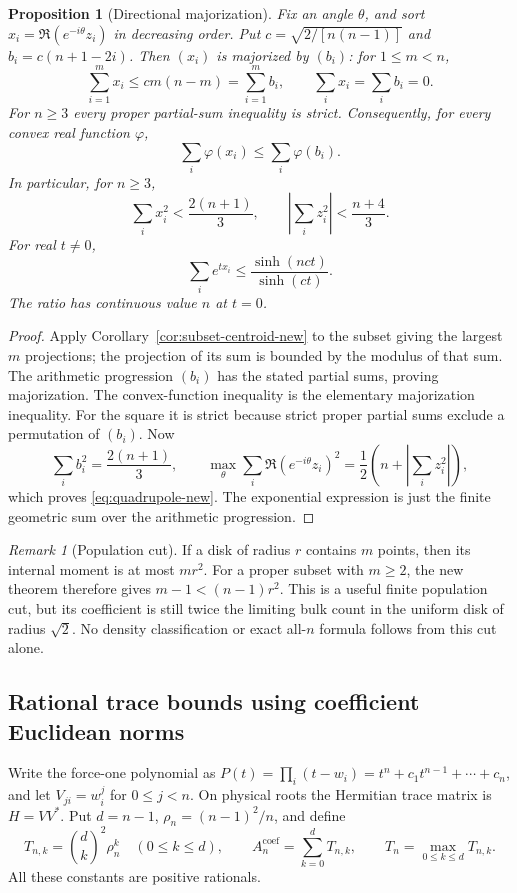 \documentclass[11pt]{article}
\newtheorem{proposition}[theorem]{Proposition}
\theoremstyle{remark}
\newtheorem{remark}[theorem]{Remark}
\numberwithin{equation}{section}
\begin{document}
\begin{proposition}[Directional majorization]\label{prop:projection-new}
Fix an angle $\theta$, and sort
$x_i=\Re(e^{-i\theta}z_i)$ in decreasing order. Put
$c=\sqrt{2/[n(n-1)]}$ and $b_i=c(n+1-2i)$. Then $(x_i)$ is
majorized by $(b_i)$: for $1\le m<n$,
\[
 \sum_{i=1}^m x_i\le c m(n-m)=\sum_{i=1}^m b_i,
 \qquad \sum_i x_i=\sum_i b_i=0.
\]
For $n\ge3$ every proper partial-sum inequality is strict. Consequently,
for every convex real function $\varphi$,
\[
                   \sum_i\varphi(x_i)\le\sum_i\varphi(b_i).
\]
In particular, for $n\ge3$,
\begin{equation}\label{eq:quadrupole-new}
 \sum_i x_i^2<\frac{2(n+1)}3,\qquad
 \left|\sum_i z_i^2\right|<\frac{n+4}3.
\end{equation}
For real $t\ne0$,
\[
 \sum_i e^{t x_i}\le\frac{\sinh(nct)}{\sinh(ct)}.
\]
The ratio has continuous value $n$ at $t=0$.
\end{proposition}
\begin{proof}
Apply Corollary~\ref{cor:subset-centroid-new} to the subset giving the
largest $m$ projections; the projection of its sum is bounded by the
modulus of that sum. The arithmetic progression $(b_i)$ has the stated
partial sums, proving majorization. The convex-function inequality is
the elementary majorization inequality. For the square it is strict
because strict proper partial sums exclude a permutation of $(b_i)$.
Now
\[
 \sum_i b_i^2=\frac{2(n+1)}3,\qquad
 \max_\theta\sum_i\Re(e^{-i\theta}z_i)^2
       =\frac12\left(n+\left|\sum_i z_i^2\right|\right),
\]
which proves \eqref{eq:quadrupole-new}. The exponential expression is
just the finite geometric sum over the arithmetic progression.
\end{proof}

\begin{remark}[Population cut]
If a disk of radius $r$ contains $m$ points, then its internal moment
is at most $mr^2$. For a proper subset with $m\ge2$, the new theorem
therefore gives $m-1<(n-1)r^2$. This is a useful finite population cut,
but its coefficient is still twice the limiting bulk count in the
uniform disk of radius $\sqrt2$. No density classification or exact
all-$n$ formula follows from this cut alone.
\end{remark}

\subsection{Rational trace bounds using coefficient Euclidean norms}
Write the force-one polynomial as
$P(t)=\prod_i(t-w_i)=t^n+c_1t^{n-1}+\cdots+c_n$, and let
$V_{ji}=w_i^j$ for $0\le j<n$. On physical roots the Hermitian trace
matrix is $H=VV^*$. Put $d=n-1$, $\rho_n=(n-1)^2/n$, and define
\[
 T_{n,k}=\binom dk^2\rho_n^k\quad(0\le k\le d),\qquad
 A_n^{\mathrm{coef}}=\sum_{k=0}^dT_{n,k},\qquad T_n=\max_{0\le k\le d}T_{n,k}.
\]
All these constants are positive rationals.
\end{document}
